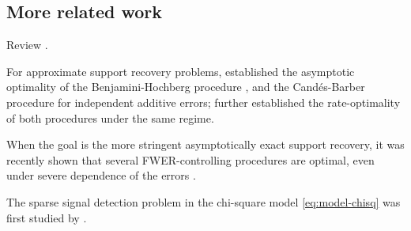 \subsection{More related work}

Review \cite{jin2014optimality, jin2016rare, butucea2018variable, arias2017distribution, gao2018fundamental, ji2012ups, rabinovich2017optimal}.


For approximate support recovery problems, \citet*{arias2017distribution} established the asymptotic optimality of the Benjamini-Hochberg procedure \cite{benjamini1995controlling}, and the Cand\'es-Barber procedure \cite{barber2015controlling} for independent additive errors;
\citet{rabinovich2017optimal} further established the rate-optimality of both procedures under the same regime.

When the goal is the more stringent asymptotically exact support recovery, it was recently shown that several FWER-controlling procedures are optimal, even under severe dependence of the errors \cite{gao2018fundamental}.

The sparse signal detection problem in the chi-square model \eqref{eq:model-chisq} was first studied by \cite{donoho2004higher}.


\cite{gao2019upass}

